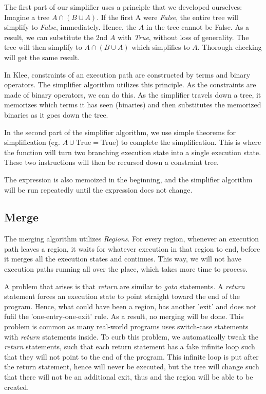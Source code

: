\documentclass[12pt,twocolumn,a4paper]{article}
\begin{document}
The first part of our simplifier uses a principle that we developed ourselves:
Imagine a tree $A\cap(B\cup A)$. If the first A were \emph{False}, the entire tree will simplify to \emph{False}, immediately. Hence, the $A$ in the tree cannot be False. As a result, we can substitute the 2nd $A$ with \emph{True}, without loss of generality. The tree will then simplify to $A\cap(B\cup A)$ which simplifies to $A$. Thorough checking will get the same result.

In Klee, constraints of an execution path are constructed by terms and binary operators. The simplifier algorithm utilizes this principle. As the constraints are made of binary operators, we can do this. As the simplifier travels down a tree, it memorizes which terms it has seen (binaries) and then substitutes the memorized binaries as it goes down the tree.

In the second part of the simplifier algorithm, we use simple theorems for simplification (eg. $A\cup \text{True} = \text{True}$) to complete the simplification. This is where the function will turn two branching execution state into a single execution state. These two instructions will then be recursed down a constraint tree.

The expression is also memoized in the beginning, and the simplifier algorithm will be run repeatedly until the expression does not change.

\subsection{Merge}
The merging algorithm utilizes \emph{Regions}. For every region, whenever an execution path leaves a region, it waits for whatever execution in that region to end, before it merges all the execution states and continues. This way, we will not have execution paths running all over the place, which takes more time to process.

A problem that arises is that \emph{return} are similar to \emph{goto} statements. A \emph{return} statement forces an execution state to point straight toward the end of the program. Hence, what could have been a region, has another 'exit' and does not fufil the 'one-entry-one-exit' rule. As a result, no merging will be done. This problem is common as many real-world programs uses switch-case statements with \emph{return} statements inside. To curb this problem, we automatically tweak the \emph{return} statements, such that each return statement has a fake infinite loop such that they will not point to the end of the program. This infinite loop is put after the return statement, hence will never be executed, but the tree will change such that there will not be an additional exit, thus and the region will be able to be created.
\end{document}
